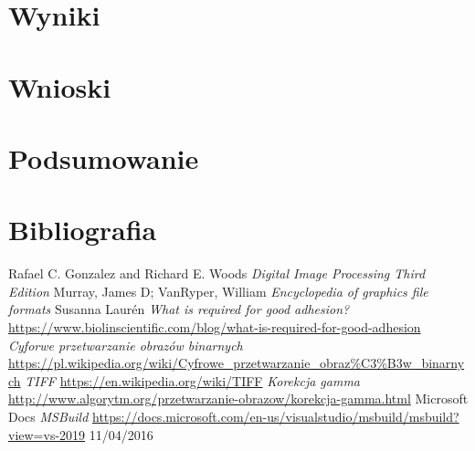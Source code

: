 \documentclass{article}
\begin{document}
    \section{Wyniki}
    \section{Wnioski}
    \newpage
    \section{Podsumowanie}
    \newpage
    \section{Bibliografia}
    \begin{thebibliography}{9}
        Rafael C. Gonzalez and Richard E. Woods
        \textit{Digital Image Processing Third Edition}
        Murray, James D; VanRyper, William
        \textit{Encyclopedia of graphics file formats}
        Susanna Laurén
        \textit{What is required for good adhesion?}
        \url{https://www.biolinscientific.com/blog/what-is-required-for-good-adhesion}
        \textit{Cyforwe przetwarzanie obrazów binarnych}
        \url{https://pl.wikipedia.org/wiki/Cyfrowe_przetwarzanie_obraz%C3%B3w_binarnych}
        \textit{TIFF}
        \url{https://en.wikipedia.org/wiki/TIFF}
        \textit{Korekcja gamma}
        \url{http://www.algorytm.org/przetwarzanie-obrazow/korekcja-gamma.html}
        Microsoft Docs
        \textit{MSBuild}
        \url{https://docs.microsoft.com/en-us/visualstudio/msbuild/msbuild?view=vs-2019}
        11/04/2016
    \end{thebibliography}
    \newpage
    \listoffigures
\end{document}
